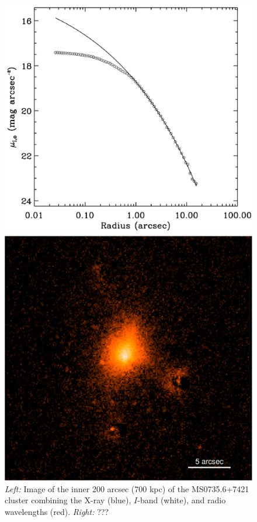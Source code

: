\documentclass[12pt]{article}
\begin{document}
\begin{figure}[ht]
\begin{center}
\begin{minipage}{0.52\linewidth}
    \end{minipage}
    \caption{{\it{Left:}} Image of the inner 200 arcsec (700 kpc) of
      the MS0735.6+7421 cluster combining the X-ray (blue), $I$-band
      (white), and radio wavelengths (red). {\it{Right:}} ???}
    \begin{minipage}{0.52\linewidth}    
      \includegraphics*[width=\textwidth, trim=15mm 5mm 0mm 10mm, clip]{fig9}
    \end{minipage}
    \begin{minipage}{0.47\linewidth}    
      \includegraphics*[width=\textwidth]{MS0735_Halpha}

\end{minipage}
\end{center}
\end{figure}
\end{document}
